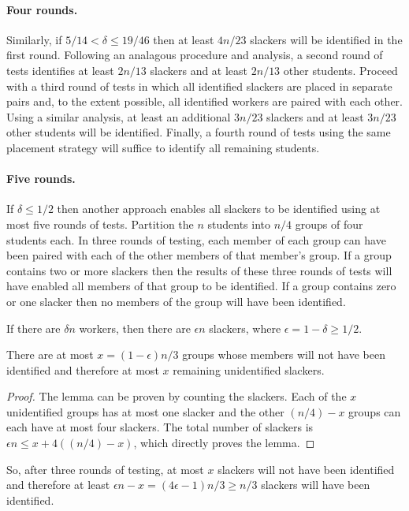 \documentclass[11pt]{llncs}
\renewcommand{\subsection}[1]{\paragraph{\bf #1.}}
\begin{document}
\subsection{Four rounds}
Similarly, if $5/14 < \delta \leq 19/46$ then at least $4n/23$ slackers will be
identified in the first round.
Following an analagous procedure and analysis, a second round of tests
identifies at least $2n/13$ slackers and at least $2n/13$ other students.
Proceed with a third round of tests in which all identified slackers are placed
in separate pairs and, to the extent possible, all identified workers are paired
with each other.  Using a similar analysis, at least an additional $3n/23$
slackers and at least $3n/23$ other students will be identified.
Finally, a fourth round of tests using the same placement strategy will suffice
to identify all remaining students.

\subsection{Five rounds}
If $\delta \leq 1/2$ then another approach enables all slackers to be identified
using at most five rounds of tests.
Partition the $n$ students into $n/4$ groups of four students each.
In three rounds of testing, each member of each group can have been paired with each
of the other members of that member's group.
If a group contains two or more slackers then the results of these three rounds of
tests will have enabled all members of that group to be identified.
If a group contains zero or one slacker then no members of the group will have been
identified.

If there are $\delta n$ workers, then there are $\epsilon n$ slackers,
where $\epsilon=1-\delta \geq 1/2$.

\begin{lemma}
There are at most $x = (1-\epsilon)n/3$ groups whose members will
not have been identified and therefore at most $x$ remaining unidentified slackers.
\end{lemma}
\begin{proof}
The lemma can be proven by counting the slackers.
Each of the $x$ unidentified groups has at most one slacker
and the other $(n/4)-x$ groups can each have at most four slackers.
The total number of slackers is $\epsilon n \leq x + 4((n/4)-x)$,
which directly proves the lemma.
\end{proof}

So, after three rounds of testing,
at most $x$ slackers will not have been identified and therefore
at least $\epsilon n - x = (4\epsilon-1)n/3 \geq n/3$ slackers
will have been identified.
\end{document}
